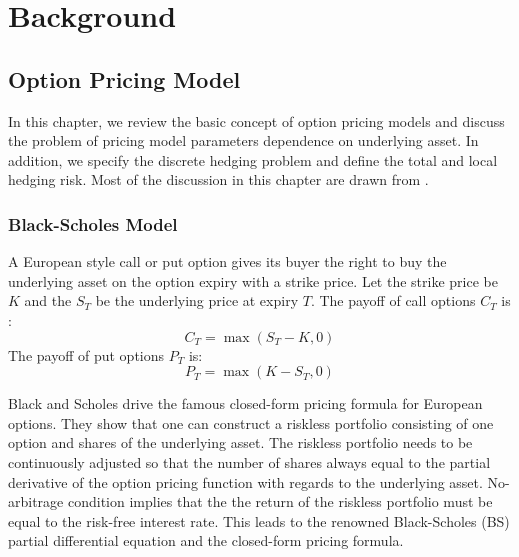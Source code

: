 \documentclass[letterpaper,12pt,titlepage,oneside,final]{book}
\numberwithin{equation}{section}
\theoremstyle{definition}
\begin{document}
\chapter{Background}
\section{Option Pricing Model}
In this chapter, we review the basic concept of option pricing models and discuss the problem of pricing model parameters dependence on underlying asset.  In addition, we specify the discrete hedging problem and define the total and local hedging risk. Most of the discussion in this chapter are drawn from \cite{shreve2004stochastic,heston1993closed,bartlett2006hedging,hagan2017bartlett,hagan2002managing}.
\subsection{Black-Scholes Model}
\label{sec:bs}
A European style call or put option gives its buyer the right to buy the underlying asset on the option expiry with a strike price. Let the strike price be $K$ and  the $S_T$ be the underlying price at expiry $T$. The payoff of call options $C_T$ is :
\[
C_T=\max(S_T-K,0)
\]
The payoff of put options $P_T$ is:
\[
P_T=\max(K-S_T,0)
\]

Black and Scholes \cite{black1973pricing} drive the famous closed-form pricing formula for European options. They show that one can construct a riskless portfolio consisting of one option and shares of the underlying asset. The riskless portfolio needs to be continuously adjusted so that the number of shares always equal to the partial derivative of the option pricing function with regards to the underlying asset. No-arbitrage condition implies that the the return of the riskless portfolio must be equal to the risk-free interest rate. This leads to the renowned Black-Scholes (BS) partial differential equation and the closed-form pricing formula.
\end{document}
